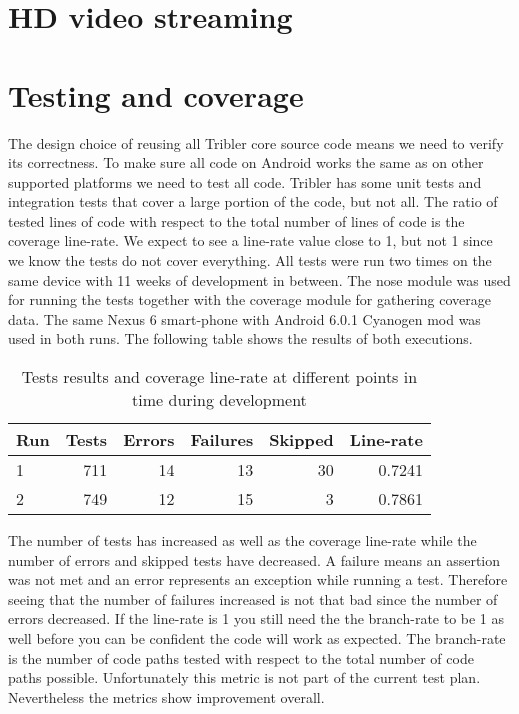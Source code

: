 \section{HD video streaming}


\section{Testing and coverage}
The design choice of reusing all Tribler core source code means we need to verify its correctness.
To make sure all code on Android works the same as on other supported platforms we need to test all code.
Tribler has some unit tests and integration tests that cover a large portion of the code, but not all.
The ratio of tested lines of code with respect to the total number of lines of code is the coverage line-rate.
We expect to see a line-rate value close to 1, but not 1 since we know the tests do not cover everything.
All tests were run two times on the same device with 11 weeks of development in between.
The nose module was used for running the tests together with the coverage module for gathering coverage data.
The same Nexus 6 smart-phone with Android 6.0.1 Cyanogen mod was used in both runs.
The following table shows the results of both executions.
\begin{table}
	\begin{tabular}{l | *{5}{r}} \hline
		Run & Tests & Errors & Failures & Skipped & Line-rate \\ \hline \hline
		1     & 711   & 14       & 13          & 30          & 0.7241 \\ \hline
		2     & 749   & 12       & 15          & 3            & 0.7861 \\ \hline
	\end{tabular}
	\caption{Tests results and coverage line-rate at different points in time during development}
	\label{table:testing_coverage}
\end{table}
The number of tests has increased as well as the coverage line-rate while the number of errors and skipped tests have decreased.
A failure means an assertion was not met and an error represents an exception while running a test.
Therefore seeing that the number of failures increased is not that bad since the number of errors decreased.
If the line-rate is 1 you still need the the branch-rate to be 1 as well before you can be confident the code will work as expected.
The branch-rate is the number of code paths tested with respect to the total number of code paths possible.
Unfortunately this metric is not part of the current test plan.
Nevertheless the metrics show improvement overall.


